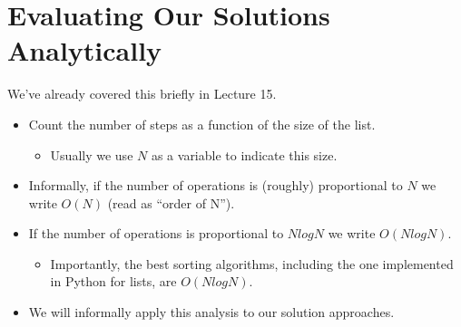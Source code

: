 \documentclass[letterpaper,10pt,english]{sphinxmanual}
\begin{document}
\section{Evaluating Our Solutions Analytically}
\label{\detokenize{lecture_notes/lec20_searching:evaluating-our-solutions-analytically}}
We’ve already covered this briefly in Lecture 15.
\begin{itemize}
\item {} 
Count the number of steps as a function of the size of the list.
\begin{itemize}
\item {} 
Usually we use \(N\) as a variable to indicate this size.

\end{itemize}

\item {} 
Informally, if the number of operations is (roughly) proportional to
\(N\) we write \(O(N)\) (read as “order of N”).

\item {} 
If the number of operations is proportional to \(N log N\) we
write \(O(N log N)\).
\begin{itemize}
\item {} 
Importantly, the best sorting algorithms, including the one
implemented in Python for lists, are \(O(N log N)\).

\end{itemize}

\item {} 
We will informally apply this analysis to our solution approaches.

\end{itemize}
\end{document}
